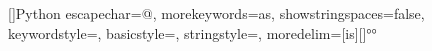 \usepackage{listings}
\renewcommand{\lstlistingname}{Quelltext}
\renewcommand{\lstlistlistingname}{Quelltextverzeichnis}

\newcommand{\colorClasses}{\color{PineGreen}}
\newcommand{\colorInterfaces}{\color{DarkOrchid}}
\newcommand{\colorMethods}{\color{Orange}}
\newcommand{\colorKeyword}{\color{blue}}

[]{Python}{
  escapechar=@,
  morekeywords={as},
  showstringspaces=false,
  keywordstyle=\color{blue},
  basicstyle={\color{blue!35!black!95!white}\scriptsize{}\selectfont},
  stringstyle=\color{orange},
  moredelim=[is][\color{black}]{°}{°}
}

\lstset{
  columns=fullflexible,
  language=mypy,
  xleftmargin=2em
}


